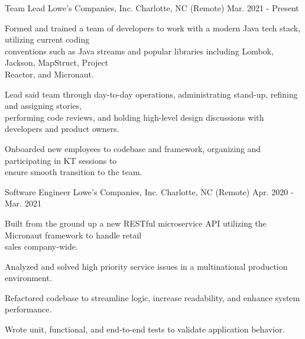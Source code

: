 

\begin{cventries}

  \cventry
    {Team Lead}
    {Lowe's Companies, Inc.}
    {Charlotte, NC (Remote)}
    {Mar. 2021 - Present}
    {
        \begin{cvitems}
            \item {Formed and trained a team of developers to work with a modern Java tech stack, utilizing current coding \\conventions such as Java streams and popular libraries including Lombok, Jackson, MapStruct, Project \\Reactor, and Micronaut.}
            \item {Lead said team through day-to-day operations, administrating stand-up, refining and assigning stories, \\performing code reviews, and holding high-level design discussions with developers and product  owners.}
            \item {Onboarded new employees to codebase and framework, organizing and participating in KT sessions to \\ensure smooth transition to the team.}
        \end{cvitems}
    }
    
  \cventry
    {Software Engineer}
    {Lowe's Companies, Inc.}
    {Charlotte, NC (Remote)}
    {Apr. 2020 - Mar. 2021}
    {
        \begin{cvitems}
            \item {Built from the ground up a new RESTful microservice API utilizing the Micronaut framework to handle retail \\sales company-wide.}
            \item {Analyzed and solved high priority service issues in a multinational production environment.}
            \item {Refactored codebase to streamline logic, increase readability, and enhance system performance.}
            \item {Wrote unit, functional, and end-to-end tests to validate application behavior.}
        \end{cvitems}
    }
    

\end{cventries}
